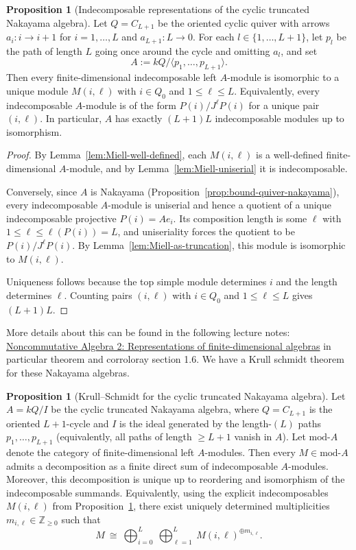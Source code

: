 \documentclass{article}
\theoremstyle{definition}
\newtheorem{proposition}[theorem]{Proposition}
\begin{document}
\begin{proposition}[Indecomposable representations of the cyclic truncated Nakayama algebra]
\label{prop:indecomp-cyclic-nakayama}
Let $Q=C_{L+1}$ be the oriented cyclic quiver with arrows $a_i:i\to i+1$ for $i=1,\dots,L$ and $a_{L+1}:L\to 0$.
For each $l\in\{1,\dots,L+1\}$, let $p_l$ be the path of length $L$ going once around the cycle and omitting $a_l$, and set
\[
A := kQ / \langle p_1,\dots,p_{L+1}\rangle.
\]
Then every finite-dimensional indecomposable left $A$-module is isomorphic to a unique module $M(i,\ell)$ with $i\in Q_0$ and $1\le \ell\le L$.
Equivalently, every indecomposable $A$-module is of the form $P(i)/J^{\ell}P(i)$ for a unique pair $(i,\ell)$.
In particular, $A$ has exactly $(L+1)L$ indecomposable modules up to isomorphism.
\end{proposition}

\begin{proof}
By Lemma~\ref{lem:Miell-well-defined}, each $M(i,\ell)$ is a well-defined finite-dimensional $A$-module, and by Lemma~\ref{lem:Miell-uniserial} it is indecomposable.

Conversely, since $A$ is Nakayama (Proposition~\ref{prop:bound-quiver-nakayama}), every indecomposable $A$-module is uniserial and hence a quotient of a unique indecomposable projective $P(i)=Ae_i$.
Its composition length is some $\ell$ with $1\le \ell\le \ell(P(i))=L$, and uniseriality forces the quotient to be $P(i)/J^{\ell}P(i)$.
By Lemma~\ref{lem:Miell-as-truncation}, this module is isomorphic to $M(i,\ell)$.

Uniqueness follows because the top simple module determines $i$ and the length determines $\ell$.
Counting pairs $(i,\ell)$ with $i\in Q_0$ and $1\le \ell\le L$ gives $(L+1)L$.
\end{proof}
More details about this can be found in the following lecture notes:
\href{https://www.math.uni-bielefeld.de/~wcrawley/1920noncommalg2/NA2.pdf}{Noncommutative Algebra 2: Representations of finite-dimensional algebras} in particular theorem and corroloray section 1.6.
We have a Krull schmidt theorem for these Nakayama algebras.
\begin{proposition}[Krull--Schmidt for the cyclic truncated Nakayama algebra]\label{prop:KS-cyclic-truncated-nakayama}
Let $A=kQ/I$ be the cyclic truncated Nakayama algebra, where $Q=C_{L+1}$ is the oriented $L+1$-cycle and $I$ is the ideal generated by the length-$(L)$ paths $p_1,\dots,p_{L+1}$ (equivalently, all paths of length $\ge L+1$ vanish in $A$).
Let $\mathrm{mod}\text{-}A$ denote the category of finite-dimensional left $A$-modules.
Then every $M\in \mathrm{mod}\text{-}A$ admits a decomposition as a finite direct sum of indecomposable $A$-modules.
Moreover, this decomposition is unique up to reordering and isomorphism of the indecomposable summands.
Equivalently, using the explicit indecomposables $M(i,\ell)$ from Proposition~\ref{prop:indecomp-cyclic-nakayama}, there exist uniquely determined multiplicities
$m_{i,\ell}\in\mathbb{Z}_{\ge 0}$ such that
\[
M \ \cong\ \bigoplus_{i=0}^{L} \ \bigoplus_{\ell=1}^{L} \ M(i,\ell)^{\oplus m_{i,\ell}}.
\]
\end{proposition}
\end{document}
